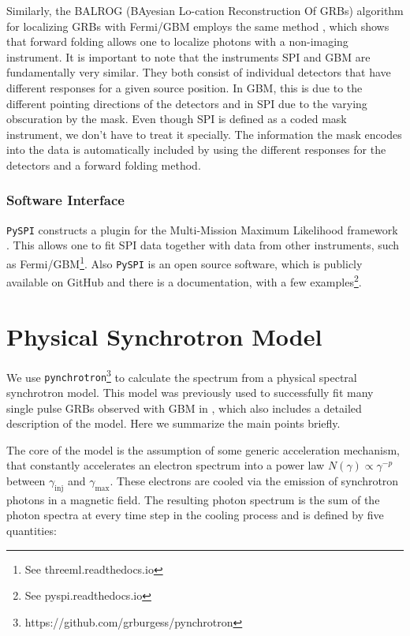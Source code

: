 \documentclass[twocolumn,traditabstract]{aa}
\begin{document}
Similarly, the BALROG (BAyesian Lo-cation Reconstruction Of GRBs) algorithm for localizing GRBs with Fermi/GBM employs the same method \citep{balrog}, which shows that forward folding allows one to localize photons with a non-imaging instrument. It is important to note that the instruments SPI and GBM are fundamentally very similar. They both consist of individual detectors that have different responses for a given source position. In GBM, this is due to the different pointing directions of the detectors and in SPI due to the varying obscuration by the mask. Even though SPI is defined as a coded mask instrument, we don't have to treat it specially. The information the mask encodes into the data is automatically included by using the different responses for the detectors and a forward folding method.

\subsubsection{Software Interface}

{\tt PySPI} constructs a plugin for the Multi-Mission Maximum Likelihood framework \citep[3ML][]{3ML}. This allows one to fit SPI data together with data from other instruments, such as Fermi/GBM\footnote{See threeml.readthedocs.io}. Also {\tt PySPI} is an open source software, which is publicly available on GitHub \citep{joss} and there is a documentation, with a few examples\footnote{See pyspi.readthedocs.io}.

\section{Physical Synchrotron Model}
\label{synch}
We use {\tt pynchrotron}\footnote{https://github.com/grburgess/pynchrotron} to calculate the spectrum from a physical spectral synchrotron model. This model was previously used to successfully fit many single pulse GRBs observed with GBM in \citet{synch}, which also includes a detailed description of the model. Here we summarize the main points briefly.

The core of the model is the assumption of some generic acceleration mechanism, that constantly accelerates an electron spectrum into a power law $N(\gamma )\propto \gamma^{-p}$ between $\gamma_{\textrm{inj}}$ and $\gamma_{\textrm{max}}$. These electrons are cooled via the emission of synchrotron photons in a magnetic field. The resulting photon spectrum is the sum of the photon spectra at every time step in the cooling process and is defined by five quantities:
\end{document}
